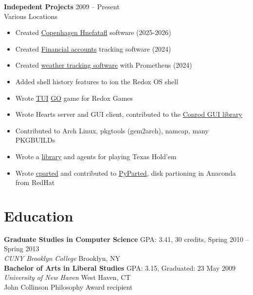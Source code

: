\documentclass[letterpaper,10pt]{article}
\begin{document}
\vspace{6pt}
\noindent\textbf{Indepedent Projects} \hfill 2009 -- Present \\
\textit{} \hfill Various Locations
\begin{itemize}
    \item Created \href{https://github.com/dcampbell24/hnefatafl}{Copenhagen Hnefatafl} software (2025-2026)
    \item Created \href{https://github.com/dcampbell24/financial-accounts}{Financial accounts} tracking software (2024)
    \item Created \href{https://github.com/dcampbell24/prometheus-sensors}{weather tracking software} with Prometheus (2024)
    \item Added shell history features to ion the Redox OS shell
    \item Wrote \href{https://gitlab.redox-os.org/redox-os/games/-/commits/master/src/baduk/main.rs}{TUI} \href{https://github.com/dcampbell24/libgo}{GO} game for Redox Games
    \item Wrote Hearts server and GUI client, contributed to the \href{https://github.com/PistonDevelopers/conrod/commits/master/?author=dcampbell24}{Conrod GUI library}
    \item Contributed to Arch Linux, pkgtools (gem2arch), namcap, many PKGBUILDs
    \item Wrote a \href{https://github.com/dcampbell24/poker}{library} and agents for playing Texas Hold'em
    \item Wrote \href{https://github.com/dcampbell24/cparted}{cparted} and contributed to \href{https://github.com/rhinstaller/pyparted}{PyParted}, disk partioning in Anaconda from RedHat
\end{itemize}

\section{Education}

\noindent\textbf{Graduate Studies in Computer Science} \hfill GPA: 3.41, 30 credits, Spring 2010 -- Spring 2013 \\
\textit{CUNY Brooklyn College} \hfill Brooklyn, NY
\\

\noindent\textbf{Bachelor of Arts in Liberal Studies} \hfill  GPA: 3.15, Graduated: 23 May 2009 \\
\textit{University of New Haven} \hfill West Haven, CT \\
John Collinson Philosophy Award recipient
\end{document}
